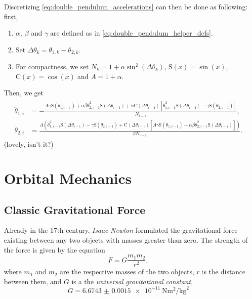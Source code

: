 \newcommand{\Si}{\text{S}}
\newcommand{\Co}{\text{C}}
Discretizing \autoref{eq:double_pendulum_accelerations} can then be done as following: first,
\begin{enumerate}
	\item $\alpha,\ \beta$ and $\gamma$ are defined as in \autoref{eq:double_pendulum_helper_defs}.
	\item Set $\Delta\theta_{k} = \theta_{1,k} - \theta_{2,k}$.
	\item For compactness, we set $N_{k} = 1+\alpha\sin^{2}\left(\Delta\theta_{k}\right)$, $\Si(x)=\sin(x)$, $\Co(x)=\cos(x)$ and $A=1+\alpha$.
\end{enumerate}
Then, we get
\begin{align}
	\begin{split}
		\ddot{\theta}_{1,i} & = -\frac{A\gamma\Si(\theta_{1,i-1})+\alpha\beta\dot{\theta}_{2,i-1}^{2}\Si\left(\Delta\theta_{i-1}\right) + \alpha\Co\left(\Delta\theta_{i-1}\right)\left[\dot{\theta}_{1,i-1}^{2}\Si\left(\Delta\theta_{i-1}\right)-\gamma\Si\left(\theta_{2,i-1}\right)\right]}{N_{i-1}},                       \\
		\ddot{\theta}_{2,i} & = \frac{A\left(\dot{\theta}_{1,i-1}^{2}\Si\left(\Delta\theta_{i-1}\right)-\gamma\Si\left(\theta_{2,i-1}\right)+\Co\left(\Delta\theta_{i-1}\right)\left[A\gamma\Si\left(\theta_{1,i-1}\right)+\alpha\beta\dot{\theta}_{2,i-1}^{2}\Si\left(\Delta\theta_{i-1}\right)\right]\right)}{\beta N_{i-1}}.
	\end{split}
\end{align}
(lovely, isn't it?)

\section{Orbital Mechanics}
\subsection{Classic Gravitational Force}
Already in the 17th century, \textit{Isaac Newton} formulated the gravitational force existing between any two objects with masses greater than zero. The strength of the force is given by the equation
\begin{equation}
	F = G\frac{m_{1}m_{2}}{r^{2}},
	\label{eq:force_gravity}
\end{equation}
where $m_{1}$ and $m_{2}$ are the respective masses of the two objects, $r$ is the distance between them, and $G$ is a the \textit{universal gravitational constant},
\begin{equation}
	G = \SI{6.6743(15)e-11}{\newton\metre\squared\per\kg\squared}
	\label{eq:universal_gravity_constant}
\end{equation}

